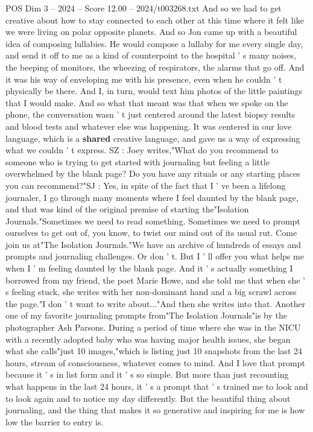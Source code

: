 \begin{textsample}{POS Dim 3 – 2024 – Score 12.00 – 2024/t003268.txt}
And so we had to get creative about how to stay connected to each other at this time where it felt like we were living on polar opposite planets.
And so Jon came up with a beautiful idea of composing lullabies.
He would compose a lullaby for me every single day, and send it off to me as a kind of counterpoint to the hospital ' s many noises, the beeping of monitors, the wheezing of respirators, the alarms that go off.
And it was his way of enveloping me with his presence, even when he couldn ' t physically be there.
And I, in turn, would text him photos of the little paintings that I would make.
And so what that meant was that when we spoke on the phone, the conversation wasn ' t just centered around the latest biopsy results and blood tests and whatever else was happening.
It was centered in our love language, which is a \textbf{shared} creative language, and gave us a way of expressing what we couldn ' t express.
SZ : Joey writes,"What do you recommend to someone who is trying to get started with journaling but feeling a little overwhelmed by the blank page?
Do you have any rituals or any starting places you can recommend?"SJ : Yes, in spite of the fact that I ' ve been a lifelong journaler, I go through many moments where I feel daunted by the blank page, and that was kind of the original premise of starting the"Isolation Journals."Sometimes we need to read something.
Sometimes we need to prompt ourselves to get out of, you know, to twist our mind out of its usual rut.
Come join us at"The Isolation Journals."We have an archive of hundreds of essays and prompts and journaling challenges.
Or don ' t.
But I ' ll offer you what helps me when I ' m feeling daunted by the blank page.
And it ' s actually something I borrowed from my friend, the poet Marie Howe, and she told me that when she ' s feeling stuck, she writes with her non-dominant hand and a big scrawl across the page."I don ' t want to write about..."And then she writes into that.
Another one of my favorite journaling prompts from"The Isolation Journals"is by the photographer Ash Parsons.
During a period of time where she was in the NICU with a recently adopted baby who was having major health issues, she began what she calls"just 10 images,"which is listing just 10 snapshots from the last 24 hours, stream of consciousness, whatever comes to mind.
And I love that prompt because it ' s in list form and it ' s so simple.
But more than just recounting what happens in the last 24 hours, it ' s a prompt that ' s trained me to look and to look again and to notice my day differently.
But the beautiful thing about journaling, and the thing that makes it so generative and inspiring for me is how low the barrier to entry is.

\end{textsample}
